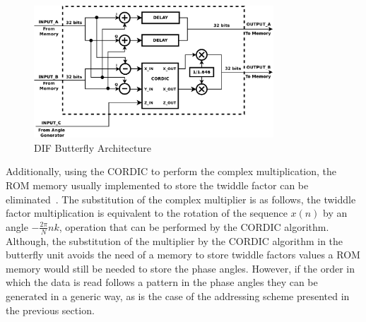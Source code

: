 \begin{figure}[htb!]
\centering
\includegraphics[width=0.8\textwidth]{./figures/butterfly_architecture.pdf}
\vspace{-0.2 cm}
\caption{DIF Butterfly Architecture}
\label{fig:btfly_arch}
\end{figure}


Additionally, using the CORDIC to perform the complex multiplication, the ROM memory usually implemented to store the twiddle factor can be eliminated~\cite{Kuo2003}\cite{Oruklu2012}. The substitution of the complex multiplier is as follows, the twiddle factor multiplication is equivalent to the rotation of the sequence $x(n)$ by an angle 
$-\frac{2\pi}{N}nk$, operation that can be performed by the CORDIC algorithm. Although, the 
substitution of the multiplier by the CORDIC algorithm in the butterfly unit avoids the need
of a memory to store twiddle factors values a ROM memory would still be needed to store the phase
angles. However, if the order in which the data is read follows a pattern in the phase angles they can be generated in a generic way, as is the case of the addressing scheme presented in the previous section. 


